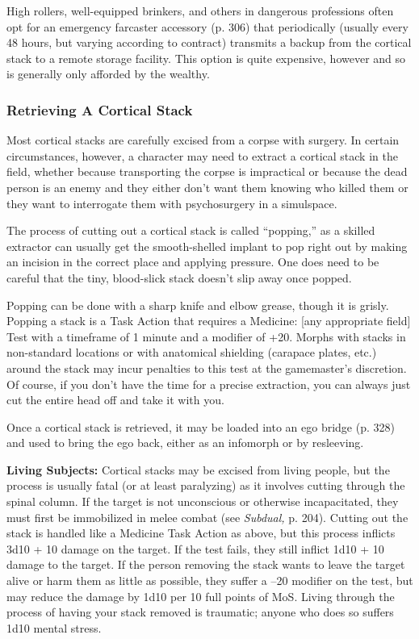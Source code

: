High rollers, well-equipped brinkers, and others 
in dangerous professions often opt for an emergency 
farcaster accessory (p. 306) that periodically (usually 
every 48 hours, but varying according to contract) 
transmits a backup from the cortical stack to a remote 
storage facility. This option is quite expensive, however
and so is generally only afforded by the wealthy.

\subsubsection{Retrieving A Cortical Stack}

Most cortical stacks are carefully excised from a 
corpse with surgery. In certain circumstances, however, 
a character may need to extract a cortical stack in the 
field, whether because transporting the corpse is impractical
or because the dead person is an enemy and
they either don't want them knowing who killed them 
or they want to interrogate them with psychosurgery 
in a simulspace.

The process of cutting out a cortical stack is called 
``popping,'' as a skilled extractor can usually get the 
smooth-shelled implant to pop right out by making 
an incision in the correct place and applying pressure. 
One does need to be careful that the tiny, blood-slick 
stack doesn't slip away once popped.

Popping can be done with a sharp knife and elbow 
grease, though it is grisly. Popping a stack is a Task 
Action that requires a Medicine: [any appropriate 
field] Test with a timeframe of 1 minute and a modifier
of +20. Morphs with stacks in non-standard locations
or with anatomical shielding (carapace plates,
etc.) around the stack may incur penalties to this test 
at the gamemaster's discretion. Of course, if you don't 
have the time for a precise extraction, you can always 
just cut the entire head off and take it with you.

Once a cortical stack is retrieved, it may be loaded 
into an ego bridge (p. 328) and used to bring the ego 
back, either as an infomorph or by resleeving.

\textbf{Living Subjects:} Cortical stacks may be excised 
from living people, but the process is usually fatal (or 
at least paralyzing) as it involves cutting through the 
spinal column. If the target is not unconscious or otherwise
incapacitated, they must first be immobilized
in melee combat (see \textit{Subdual,} p. 204). Cutting out 
the stack is handled like a Medicine Task Action as 
above, but this process inflicts 3d10 + 10 damage on 
the target. If the test fails, they still inflict 1d10 + 10 
damage to the target. If the person removing the stack 
wants to leave the target alive or harm them as little 
as possible, they suffer a –20 modifier on the test, but 
may reduce the damage by 1d10 per 10 full points of 
MoS. Living through the process of having your stack 
removed is traumatic; anyone who does so suffers 
1d10 mental stress.

